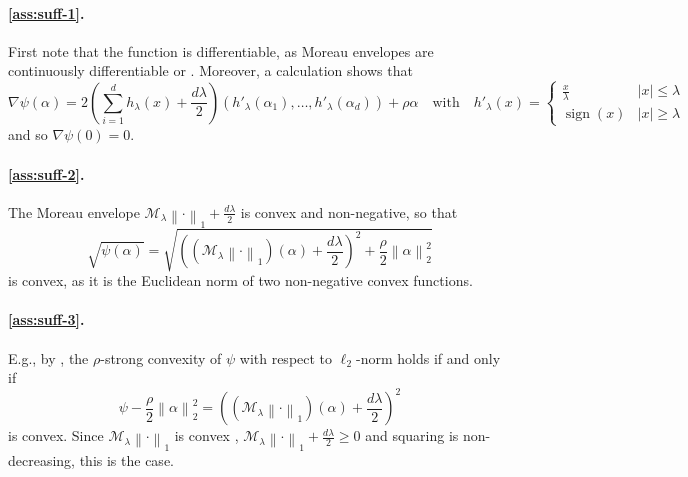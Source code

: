 \documentclass[a4paper]{article}
\newcommand{\pr}[1]{\left(#1\right)}
\newcommand{\abs}[1]{\left\lvert#1\right\rvert}
\newcommand{\norm}[1]{\left\|#1\right\|}
\newcommand{\cM}[0]{\mathcal{M}}
\DeclareMathOperator{\signOp}{sign}
\newcommand{\sign}[1]{\signOp\pr{#1}}
\theoremstyle{thmstyle}
\theoremstyle{defstyle}
\theoremstyle{remark}
\begin{document}
    
    \paragraph{\ref{ass:suff-1}.} First note that the function is differentiable, as Moreau envelopes are continuously differentiable \citep[\S 3.1]{Parikh2014proximal} or \citep[\S 4.2]{Beck2012smoothing}. Moreover, a calculation shows that
    \begin{equation*}
        \nabla\psi(\alpha) = 2\pr{\sum_{i=1}^d h_\lambda(x)+\frac{d\lambda}{2}}\pr{h'_\lambda(\alpha_1),\dots,h'_\lambda(\alpha_d)} + \rho \alpha \quad \text{with} \quad h'_\lambda(x)=
        \begin{cases}
            \frac{x}{\lambda} & \abs{x}\leq \lambda \\
            \sign{x} & \abs{x}\geq \lambda
        \end{cases}
    \end{equation*}
    and so $\nabla\psi(0)=0$.

    \paragraph{\ref{ass:suff-2}.} The Moreau envelope $\cM_\lambda \norm{\cdot}_1+\frac{d\lambda}{2}$ is convex \citep[\S 4.2]{Beck2012smoothing} and non-negative, so that
    \begin{equation*}
        \sqrt{\psi(\alpha)} = \sqrt{\pr{(\cM_\lambda \norm{\cdot}_1)(\alpha)+\frac{d\lambda}{2}}^2+\frac{\rho}{2}\norm{\alpha}_2^2}
    \end{equation*}
    is convex, as it is the Euclidean norm of two non-negative convex functions.

    \paragraph{\ref{ass:suff-3}.} E.g., by \cite{Nikodem2011characterization}, the $\rho$-strong convexity of $\psi$ with respect to $\ell_2$-norm holds if and only if
    \begin{equation*}
        \psi-\frac{\rho}{2}\norm{\alpha}_2^2 = \pr{(\cM_\lambda \norm{\cdot}_1)(\alpha)+\frac{d\lambda}{2}}^2
    \end{equation*}
    is convex. Since $\cM_\lambda \norm{\cdot}_1$ is convex \citep[\S 4.2]{Beck2012smoothing}, $\cM_\lambda \norm{\cdot}_1+\frac{d\lambda}{2}\geq 0$ and squaring is non-decreasing, this is the case.
\end{document}
